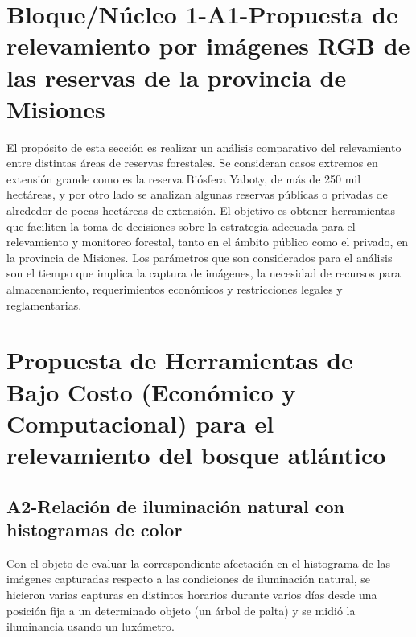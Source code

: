 
\color{black} 
\section {Bloque/Núcleo 1-A1-Propuesta de relevamiento por imágenes RGB de las reservas de la provincia de Misiones}
El propósito de esta sección es realizar un análisis comparativo del relevamiento entre distintas áreas de reservas forestales. Se consideran casos extremos en extensión grande como es la reserva Biósfera Yaboty, de más de 250 mil hectáreas, y por otro lado se analizan algunas reservas públicas o privadas de alrededor de pocas hectáreas de extensión. El objetivo es obtener herramientas que faciliten la toma de decisiones sobre la estrategia adecuada para el relevamiento y monitoreo forestal, tanto en el ámbito público como el privado, en la provincia de Misiones. Los parámetros que son considerados para el análisis son el tiempo que implica la captura de imágenes, la necesidad de recursos para almacenamiento, requerimientos económicos y restricciones legales y reglamentarias.


\section{ Propuesta de Herramientas de Bajo Costo (Económico y Computacional) para el relevamiento del bosque atlántico}
\subsection{A2-Relación de iluminación natural con histogramas de color}
Con el objeto de evaluar la correspondiente afectación en el histograma de las imágenes capturadas respecto a las condiciones de iluminación natural, se hicieron varias capturas en distintos horarios durante varios días desde una posición fija a un determinado objeto (un árbol de palta) y se midió la iluminancia usando un luxómetro.
